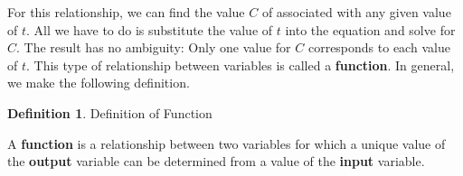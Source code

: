 \documentclass[10pt,]{book}
\newcommand{\terminology}[1]{\textbf{#1}}
\theoremstyle{plain}
\theoremstyle{definition}
\newtheorem{definition}[theorem]{Definition}
\theoremstyle{definition}
\numberwithin{equation}{section}
\begin{document}
    For this relationship, we can find the value \(C\) of associated with any given value of \(t\). All we have to do is substitute the value of \(t\) into the equation and solve for \(C\). The result has no ambiguity: Only one value for \(C\) corresponds to each value of \(t\). This type of relationship between variables is called a \terminology{function}. In general, we make the following definition.
%
\begin{definition}\label{definition-function}
Definition of Function%
\par
A \terminology{function} is a relationship between two variables for which a unique value of the \terminology{output} variable can be determined from a value of the \terminology{input} variable.
\end{definition}
\par
\end{document}
